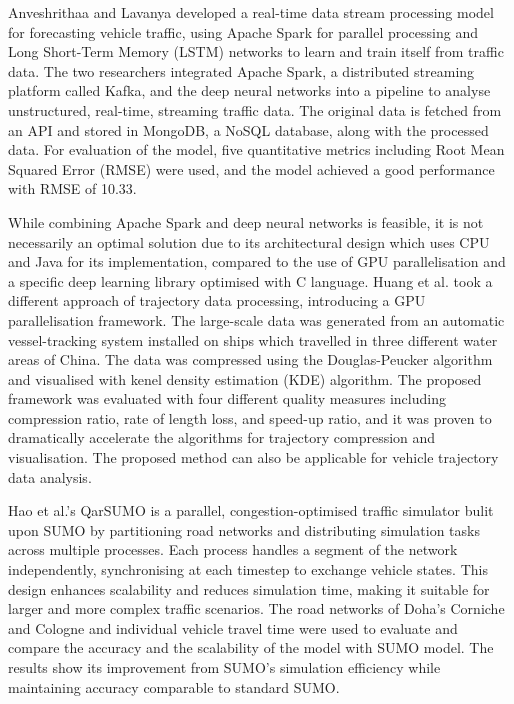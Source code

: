 \documentclass{article}
\begin{document}
Anveshrithaa and Lavanya\cite{9077707} developed a real-time data stream processing model for forecasting vehicle traffic, using Apache Spark for parallel processing and Long Short-Term Memory (LSTM) networks to learn and train itself from traffic data. The two researchers integrated Apache Spark, a distributed streaming platform called Kafka, and the deep neural networks into a pipeline to analyse unstructured, real-time, streaming traffic data. The original data is fetched from an API and stored in MongoDB, a NoSQL database, along with the processed data. For evaluation of the model, five quantitative metrics including Root Mean Squared Error (RMSE) were used, and the model achieved a good performance with RMSE of 10.33. 

While combining Apache Spark and deep neural networks is feasible, it is not necessarily an optimal solution due to its architectural design which uses CPU and Java for its implementation, compared to the use of GPU parallelisation and a specific deep learning library optimised with C language. Huang et al.\cite{9075295} took a different approach of trajectory data processing, introducing a GPU parallelisation framework. The large-scale data was generated from an automatic vessel-tracking system installed on ships which travelled in three different water areas of China. The data was compressed using the Douglas-Peucker algorithm and visualised with kenel density estimation (KDE) algorithm. The proposed framework was evaluated with four different quality measures including compression ratio, rate of length loss, and speed-up ratio, and it was proven to dramatically accelerate the algorithms for trajectory compression and visualisation. The proposed method can also be applicable for vehicle trajectory data analysis.

Hao et al.'s QarSUMO\cite{10.1145/3397536.3422274} is a parallel, congestion-optimised traffic simulator bulit upon SUMO by partitioning road networks and distributing simulation tasks across multiple processes. Each process handles a segment of the network independently, synchronising at each timestep to exchange vehicle states. This design enhances scalability and reduces simulation time, making it suitable for larger and more complex traffic scenarios. The road networks of Doha's Corniche and Cologne and individual vehicle travel time were used to evaluate and compare the accuracy and the scalability of the model with SUMO model. The results show its improvement from SUMO's simulation efficiency while maintaining accuracy comparable to standard SUMO.
\end{document}
